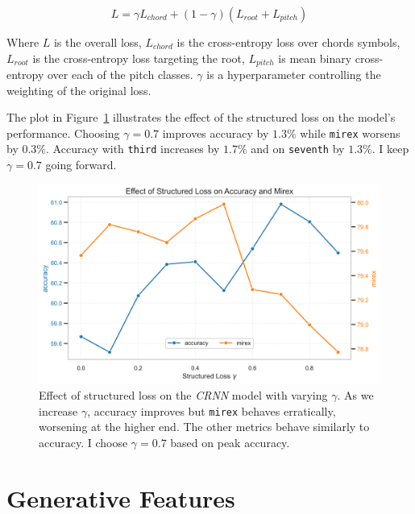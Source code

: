\begin{equation}\label{eq:structured_loss}
    L = \gamma L_{chord} + (1-\gamma)(L_{root} + L_{pitch})
\end{equation}

Where $L$ is the overall loss, $L_{chord}$ is the cross-entropy loss over chords symbols, $L_{root}$ is the cross-entropy loss targeting the root, $L_{pitch}$ is mean binary cross-entropy over each of the pitch classes. $\gamma$ is a hyperparameter controlling the weighting of the original loss. 

The plot in Figure~\ref{fig:structured_loss} illustrates the effect of the structured loss on the model's performance. Choosing $\gamma=0.7$ improves accuracy by $1.3\%$ while \texttt{mirex} worsens by $0.3\%$. Accuracy with \texttt{third} increases by $1.7\%$ and on \texttt{seventh} by $1.3\%$. I keep $\gamma=0.7$ going forward.

\begin{figure}[H]
    \centering
    \includegraphics[width=1.0\textwidth]{figures/structured_loss_accuracy.png}
    \caption{Effect of structured loss on the \emph{CRNN} model with varying $\gamma$. As we increase $\gamma$, accuracy improves but \texttt{mirex} behaves erratically, worsening at the higher end. The other metrics behave similarly to accuracy. I choose $\gamma=0.7$ based on peak accuracy. }\label{fig:structured_loss}
\end{figure}

\section{Generative Features}

